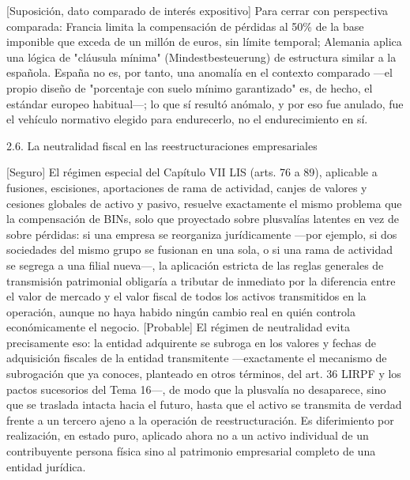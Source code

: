 \documentclass[10pt,a4paper]{article}
\begin{document}
[Suposición, dato comparado de interés expositivo] Para cerrar con perspectiva comparada: Francia limita la compensación de pérdidas al 50\% de la base imponible que exceda de un millón de euros, sin límite temporal; Alemania aplica una lógica de "cláusula mínima" (Mindestbesteuerung) de estructura similar a la española. España no es, por tanto, una anomalía en el contexto comparado —el propio diseño de "porcentaje con suelo mínimo garantizado" es, de hecho, el estándar europeo habitual—; lo que sí resultó anómalo, y por eso fue anulado, fue el vehículo normativo elegido para endurecerlo, no el endurecimiento en sí.

2.6. La neutralidad fiscal en las reestructuraciones empresariales

[Seguro] El régimen especial del Capítulo VII LIS (arts. 76 a 89), aplicable a fusiones, escisiones, aportaciones de rama de actividad, canjes de valores y cesiones globales de activo y pasivo, resuelve exactamente el mismo problema que la compensación de BINs, solo que proyectado sobre plusvalías latentes en vez de sobre pérdidas: si una empresa se reorganiza jurídicamente —por ejemplo, si dos sociedades del mismo grupo se fusionan en una sola, o si una rama de actividad se segrega a una filial nueva—, la aplicación estricta de las reglas generales de transmisión patrimonial obligaría a tributar de inmediato por la diferencia entre el valor de mercado y el valor fiscal de todos los activos transmitidos en la operación, aunque no haya habido ningún cambio real en quién controla económicamente el negocio. [Probable] El régimen de neutralidad evita precisamente eso: la entidad adquirente se subroga en los valores y fechas de adquisición fiscales de la entidad transmitente —exactamente el mecanismo de subrogación que ya conoces, planteado en otros términos, del art. 36 LIRPF y los pactos sucesorios del Tema 16—, de modo que la plusvalía no desaparece, sino que se traslada intacta hacia el futuro, hasta que el activo se transmita de verdad frente a un tercero ajeno a la operación de reestructuración. Es diferimiento por realización, en estado puro, aplicado ahora no a un activo individual de un contribuyente persona física sino al patrimonio empresarial completo de una entidad jurídica.
\end{document}
